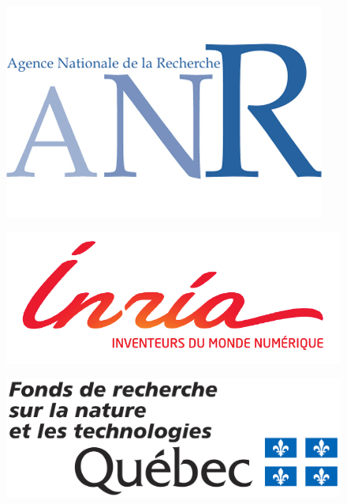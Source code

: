 \documentclass{beamer}
\begin{document}
{\begin{minipage}{0.45\textwidth}
\begin{minipage}{0.45\textwidth}
\begin{figure}
		\end{figure}
		\begin{figure}
			\centering
			\includegraphics[width=\textwidth]{Figures/logoanr.png}
		\end{figure}
		\begin{figure}
				\centering
			\includegraphics[width=\textwidth]{Figures/logoinria.png}
		\end{figure}
		\begin{figure}
			\centering
			\includegraphics[width=\textwidth]{Figures/logofqrnt.png}
		\end{figure}
		\end{minipage}
		\begin{minipage}{0.45\textwidth}
		\begin{figure}

\end{figure}
\end{minipage}
\end{minipage}}
\end{document}
